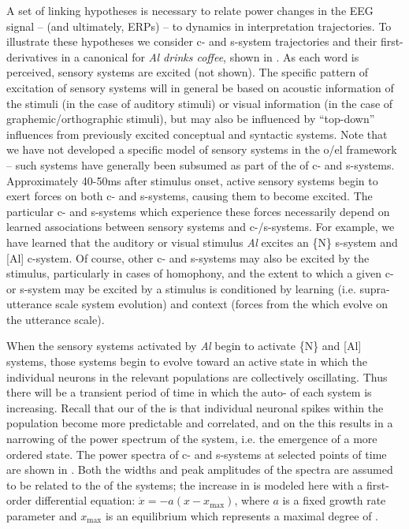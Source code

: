 A set of linking hypotheses is necessary to relate power changes in the EEG signal -- (and ultimately, ERPs) -- to  dynamics in interpretation trajectories. To illustrate these hypotheses we consider c- and s-sys\-tem  trajectories and their first-derivatives in a canonical  for \textit{Al drinks coffee}, shown in {}. As each word is perceived, sensory systems are excited (not shown). The specific pattern of excitation of sensory systems will in general be based on acoustic information of the stimuli (in the case of auditory stimuli) or visual information (in the case of graphemic/orthographic stimuli), but may also be influenced by “top-down” influences from previously excited conceptual and syntactic systems. Note that we have not developed a specific model of sensory systems in the o/el framework -- such systems have generally been subsumed as part of the  of c- and s-sys\-tems. Approximately 40-50ms after stimulus onset, active sensory systems begin to exert forces on both c- and s-sys\-tems, causing them to become excited. The particular c- and s-sys\-tems which experience these forces necessarily depend on learned associations between sensory systems and c-/s-sys\-tems. For example, we have learned that the auditory or visual stimulus \textit{Al} excites an \{N\} s-sys\-tem and [Al] c-sys\-tem. Of course, other c- and s-sys\-tems may also be excited by the stimulus, particularly in cases of homophony, and the extent to which a given c- or s-sys\-tem may be excited by a stimulus is conditioned by learning (i.e. supra-utterance scale system evolution) and context (forces from the  which evolve on the utterance scale).

  When the sensory systems activated by \textit{Al} begin to activate \{N\} and [Al] systems, those systems begin to evolve toward an active state in which the individual neurons in the relevant populations are collectively oscillating. Thus there will be a transient period of time in which the auto- of each system is increasing. Recall that our  of the  is that individual neuronal spikes within the population become more predictable and correlated, and on the  this results in a narrowing of the power spectrum of the system, i.e. the emergence of a more ordered state. The power spectra of c- and s-sys\-tems at selected points of time are shown in {}. Both the widths and peak amplitudes of the spectra are assumed to be related to the  of the systems; the increase in  is modeled here with a first-order differential equation:  $\dot{{x}}=-a\left(x-{x}_{\max}\right)$, where $a$ is a fixed growth rate parameter and $x_{\max}$ is an equilibrium which represents a maximal degree of . 

